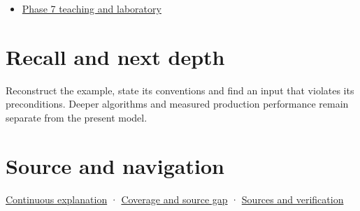\begin{itemize}
\tightlist
\item
  \href{Continuous\%20Notes/Computing\%20Foundations\%20-\%20From\%20Bits\%20to\%20C++\%20and\%20Systems\%20APIs\#Keep\%20the\%20promises\%20visible\%20while\%20moving\%20between\%20representations}{Phase 7 teaching and laboratory}
\end{itemize}

\section{Recall and next depth}\label{appendix-292c061cd47c-recall-and-next-depth}

Reconstruct the example, state its conventions and find an input that violates its preconditions. Deeper algorithms and measured production performance remain separate from the present model.

\section{Source and navigation}\label{appendix-292c061cd47c-source-and-navigation}

\href{Continuous\%20Notes/Computing\%20Foundations\%20-\%20From\%20Bits\%20to\%20C++\%20and\%20Systems\%20APIs\#Keep\%20the\%20promises\%20visible\%20while\%20moving\%20between\%20representations}{Continuous explanation} · \hyperref[appendix-fd090d982a15-phase-7---parts-601-700]{Coverage and source gap} · \hyperref[appendix-a103e7846d21-phase-7---source-analysis-and-verification]{Sources and verification}
